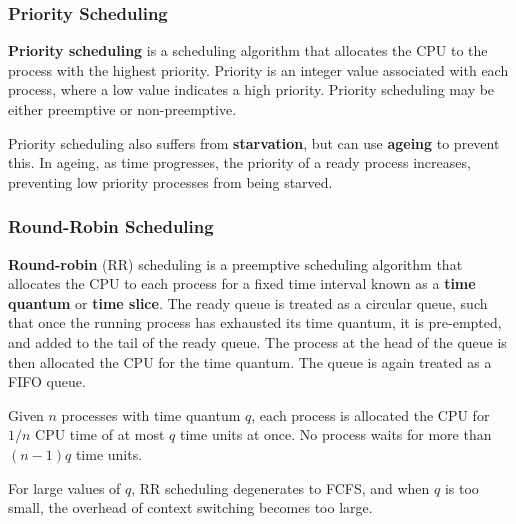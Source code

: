 \documentclass{article}
\begin{document}
\subsubsection{Priority Scheduling}
\textbf{Priority scheduling} is a scheduling algorithm that allocates
the CPU to the process with the highest priority. Priority is an integer
value associated with each process, where a low value indicates a high
priority. Priority scheduling may be either preemptive or non-preemptive.

Priority scheduling also suffers from \textbf{starvation}, but can use
\textbf{ageing} to prevent this. In ageing, as time progresses, the
priority of a ready process increases, preventing low priority
processes from being starved.
\subsubsection{Round-Robin Scheduling}
\textbf{Round-robin} (RR) scheduling is a preemptive scheduling algorithm
that allocates the CPU to each process for a fixed time interval known
as a \textbf{time quantum} or \textbf{time slice}. The ready queue is
treated as a circular queue, such that once the running process has
exhausted its time quantum, it is pre-empted, and added to the tail of
the ready queue. The process at the head of the queue is then allocated
the CPU for the time quantum. The queue is again treated as a FIFO
queue.

Given \(n\) processes with time quantum \(q\), each process is
allocated the CPU for \(1/n\) CPU time of at most \(q\) time units at
once. No process waits for more than \(\left( n-1 \right) q\) time
units.

For large values of \(q\), RR scheduling degenerates to FCFS, and when
\(q\) is too small, the overhead of context switching becomes too
large.
\end{document}
